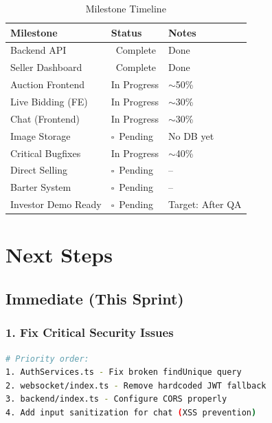 \documentclass[12pt,a4paper]{article}
\newcommand{\cmark}{\ding{51}}
\begin{document}
\begin{table}[H]
\centering
\begin{tabularx}{\textwidth}{|l|l|X|}
\hline
\textbf{Milestone} & \textbf{Status} & \textbf{Notes} \\
\hline
Backend API & \textcolor{secondary}{\cmark~Complete} & Done \\
\hline
Seller Dashboard & \textcolor{secondary}{\cmark~Complete} & Done \\
\hline
Auction Frontend & \textcolor{accent}{In Progress} & $\sim$50\% \\
\hline
Live Bidding (FE) & \textcolor{accent}{In Progress} & $\sim$30\% \\
\hline
Chat (Frontend) & \textcolor{accent}{In Progress} & $\sim$30\% \\
\hline
Image Storage & $\square$~Pending & No DB yet \\
\hline
Critical Bugfixes & \textcolor{accent}{In Progress} & $\sim$40\% \\
\hline
Direct Selling & $\square$~Pending & -- \\
\hline
Barter System & $\square$~Pending & -- \\
\hline
Investor Demo Ready & $\square$~Pending & Target: After QA \\
\hline
\end{tabularx}
\caption{Milestone Timeline}
\end{table}

\section{Next Steps}

\subsection{Immediate (This Sprint)}

\subsubsection{1. Fix Critical Security Issues}

\begin{lstlisting}[language=bash]
# Priority order:
1. AuthServices.ts - Fix broken findUnique query
2. websocket/index.ts - Remove hardcoded JWT fallback
3. backend/index.ts - Configure CORS properly
4. Add input sanitization for chat (XSS prevention)
\end{lstlisting}
\end{document}
